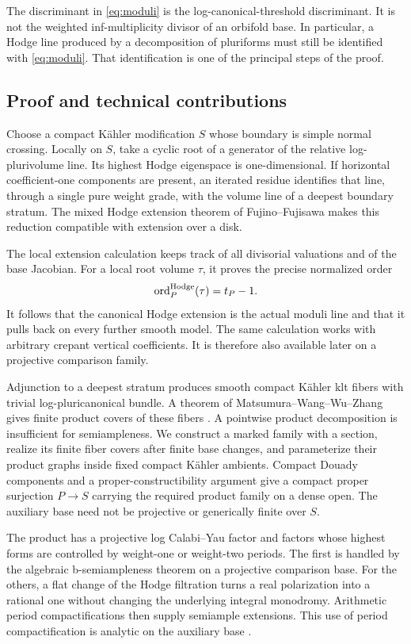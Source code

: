 The discriminant in \eqref{eq:moduli} is the log-canonical-threshold
discriminant. It is not the weighted inf-multiplicity divisor of an
orbifold base. In particular, a Hodge line produced by a decomposition
of pluriforms must still be identified with \eqref{eq:moduli}.
That identification is one of the principal steps of the proof.

\subsection{Proof and technical contributions}

Choose a compact K\"ahler modification \(S\) whose boundary is simple
normal crossing. Locally on \(S\), take a cyclic root of a generator of
the relative log-plurivolume line. Its highest Hodge eigenspace is
one-dimensional. If horizontal coefficient-one components are present,
an iterated residue identifies that line, through a single pure weight
grade, with the volume line of a deepest boundary stratum.
The mixed Hodge extension theorem of Fujino--Fujisawa
\cite[Theorem~1.1]{FF25} makes this reduction compatible with extension
over a disk.

The local extension calculation keeps track of all divisorial
valuations and of the base Jacobian. For a local root volume \(\tau\),
it proves the precise normalized order
\[
 \operatorname{ord}_P^{\mathrm{Hodge}}(\tau)=t_P-1.
\]
It follows that the canonical Hodge extension is the actual moduli
line and that it pulls back on every further smooth model. The same
calculation works with arbitrary crepant vertical coefficients.
It is therefore also available later on a projective comparison family.

Adjunction to a deepest stratum produces smooth compact K\"ahler klt
fibers with trivial log-pluricanonical bundle.
A theorem of Matsumura--Wang--Wu--Zhang gives finite product covers of
these fibers \cite[version~1, Corollary~1.3]{MWWWZ25}.
A pointwise product decomposition is insufficient for semiampleness.
We construct a marked family with a section, realize its finite fiber
covers after finite base changes, and parameterize their product graphs
inside fixed compact K\"ahler ambients.
Compact Douady components and a proper-constructibility argument give
a compact proper surjection \(P\to S\) carrying the required product
family on a dense open. The auxiliary base need not be projective or
generically finite over \(S\).

The product has a projective log Calabi--Yau factor and factors whose
highest forms are controlled by weight-one or weight-two periods.
The first is handled by the algebraic b-semiampleness theorem on a
projective comparison base. For the others, a flat change of the Hodge
filtration turns a real polarization into a rational one without
changing the underlying integral monodromy. Arithmetic period
compactifications then supply semiample extensions. This use of
period compactification is analytic on the auxiliary base
\cite[Theorems~5.2 and~5.5]{BFMT25}.

